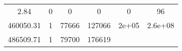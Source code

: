 \documentclass[]{book}
\theoremstyle{definition}
\theoremstyle{definition}
\theoremstyle{definition}
\theoremstyle{remark}
\begin{document}
\begin{longtable}[]{@{}cccccc@{}}
\begin{minipage}[t]{0.14\columnwidth}\centering\strut
2.84\strut
\end{minipage} & \begin{minipage}[t]{0.08\columnwidth}\centering\strut
0\strut
\end{minipage} & \begin{minipage}[t]{0.12\columnwidth}\centering\strut
0\strut
\end{minipage} & \begin{minipage}[t]{0.12\columnwidth}\centering\strut
0\strut
\end{minipage} & \begin{minipage}[t]{0.12\columnwidth}\centering\strut
0\strut
\end{minipage} & \begin{minipage}[t]{0.14\columnwidth}\centering\strut
96\strut
\end{minipage}\tabularnewline
\begin{minipage}[t]{0.14\columnwidth}\centering\strut
460050.31\strut
\end{minipage} & \begin{minipage}[t]{0.08\columnwidth}\centering\strut
1\strut
\end{minipage} & \begin{minipage}[t]{0.12\columnwidth}\centering\strut
77666\strut
\end{minipage} & \begin{minipage}[t]{0.12\columnwidth}\centering\strut
127066\strut
\end{minipage} & \begin{minipage}[t]{0.12\columnwidth}\centering\strut
2e+05\strut
\end{minipage} & \begin{minipage}[t]{0.14\columnwidth}\centering\strut
2.6e+08\strut
\end{minipage}\tabularnewline
\begin{minipage}[t]{0.14\columnwidth}\centering\strut
486509.71\strut
\end{minipage} & \begin{minipage}[t]{0.08\columnwidth}\centering\strut
1\strut
\end{minipage} & \begin{minipage}[t]{0.12\columnwidth}\centering\strut
79700\strut
\end{minipage} & \begin{minipage}[t]{0.12\columnwidth}\centering\strut
176619\strut
\end{minipage} & \begin{minipage}[t]{0.12\columnwidth}\centering\strut

\end{minipage}
\end{longtable}
\end{document}
